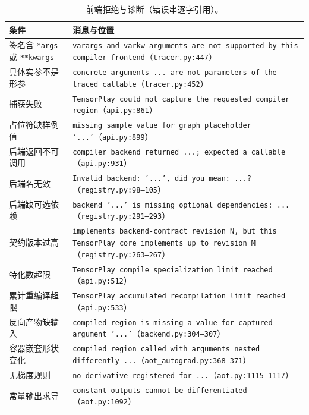 \begin{table}[H]
\centering
\caption{前端拒绝与诊断（错误串逐字引用）。}
\label{tab:fe:failures}
\small
\begin{tabular}{ll}
\toprule
条件 & 消息与位置 \\
\midrule
签名含 \texttt{*args} 或 \texttt{**kwargs} & \texttt{varargs and varkw arguments are not supported by this compiler frontend}（\texttt{tracer.py:447}） \\
具体实参不是形参 & \texttt{concrete arguments ... are not parameters of the traced callable}（\texttt{tracer.py:452}） \\
捕获失败 & \texttt{TensorPlay could not capture the requested compiler region}（\texttt{api.py:861}） \\
占位符缺样例值 & \texttt{missing sample value for graph placeholder '...'}（\texttt{api.py:899}） \\
后端返回不可调用 & \texttt{compiler backend returned ...; expected a callable}（\texttt{api.py:931}） \\
后端名无效 & \texttt{Invalid backend: '...', did you mean: ...?}（\texttt{registry.py:98--105}） \\
后端缺可选依赖 & \texttt{backend '...' is missing optional dependencies: ...}（\texttt{registry.py:291--293}） \\
契约版本过高 & \texttt{implements backend-contract revision N, but this TensorPlay core implements up to revision M}（\texttt{registry.py:263--267}） \\
特化数超限 & \texttt{TensorPlay compile specialization limit reached}（\texttt{api.py:512}） \\
累计重编译超限 & \texttt{TensorPlay accumulated recompilation limit reached}（\texttt{api.py:533}） \\
反向产物缺输入 & \texttt{compiled region is missing a value for captured argument '...'}（\texttt{backend.py:304--307}） \\
容器嵌套形状变化 & \texttt{compiled region called with arguments nested differently ...}（\texttt{aot\_autograd.py:368--371}） \\
无梯度规则 & \texttt{no derivative registered for ...}（\texttt{aot.py:1115--1117}） \\
常量输出求导 & \texttt{constant outputs cannot be differentiated}（\texttt{aot.py:1092}） \\
\bottomrule
\end{tabular}
\end{table}


